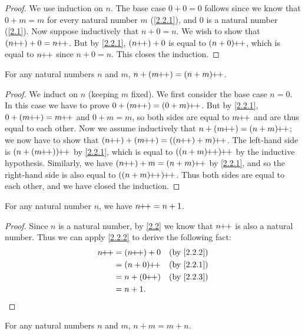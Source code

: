 \begin{proof}
  We use induction on \(n\).
  The base case \(0 + 0 = 0\) follows since we know that \(0 + m = m\) for every natural number \(m\) (\cref{2.2.1}), and \(0\) is a natural number (\cref{2.1}).
  Now suppose inductively that \(n + 0 = n\).
  We wish to show that \((n\pp) + 0 = n\pp\).
  But by \cref{2.2.1}, \((n\!\!+\!\!+) + 0\) is equal to \((n + 0)\!\!+\!\!+\), which is equal to \(n\!\!+\!\!+\) since \(n + 0 = n\).
  This closes the induction.
\end{proof}

\begin{lem}\label{2.2.3}
  For any natural numbers \(n\) and \(m\), \(n + (m\pp) = (n + m)\pp\).
\end{lem}

\begin{proof}
  We induct on \(n\) (keeping \(m\) fixed).
  We first consider the base case \(n = 0\).
  In this case we have to prove \(0 + (m\pp) = (0 + m)\pp\).
  But by \cref{2.2.1}, \(0 + (m\pp) = m\pp\) and \(0 + m = m\), so both sides are equal to \(m\!\!+\!\!+\) and are thus equal to each other.
  Now we assume inductively that \(n + (m\pp) = (n + m)\pp\);
  we now have to show that \((n\pp) + (m\pp) = ((n\pp) + m)\pp\).
  The left-hand side is \((n + (m\pp))\pp\) by \cref{2.2.1}, which is equal to \(((n+m)\pp)\pp\) by the inductive hypothesis.
  Similarly, we have \((n\pp) + m = (n + m)\pp\) by \cref{2.2.1}, and so the right-hand side is also equal to \(((n + m)\pp)\pp\).
  Thus both sides are equal to each other, and we have closed the induction.
\end{proof}

\begin{ac}\label{ac:2.2.2}
  For any natural number \(n\), we have \(n\!\!+\!\!+ = n + 1\).
\end{ac}

\begin{proof}
  Since \(n\) is a natural number, by \cref{2.2} we know that \(n\!\!+\!\!+\) is also a natural number.
  Thus we can apply \cref{2.2.2} to derive the following fact:
  \begin{align*}
    n\pp & = (n\pp) + 0 &  & \by{2.2.2} \\
         & = (n + 0)\pp &  & \by{2.2.1} \\
         & = n + (0\pp) &  & \by{2.2.3} \\
         & = n + 1.
  \end{align*}
\end{proof}

\begin{prop}\label{2.2.4}
  For any natural numbers \(n\) and \(m\), \(n + m = m + n\).
\end{prop}

